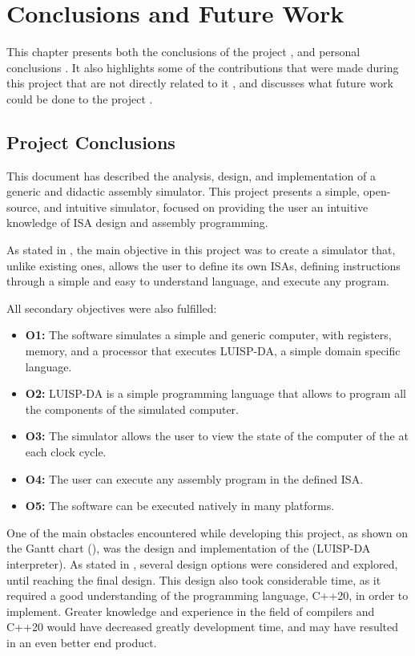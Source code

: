 \chapter{Conclusions and Future Work}\label{chap:conclusions}
This chapter presents both the conclusions of the project , and personal conclusions . It also highlights some of the contributions that were made during this project that are not directly related to it , and discusses what future work could be done to the project .


\section{Project Conclusions}\label{sec:project-conclusions}
This document has described the analysis, design, and implementation of a generic and didactic \gls{assembly} simulator. This project presents a simple, open-source, and intuitive simulator, focused on providing the user an intuitive knowledge of \gls{ISA} design and \gls{assembly} programming.

As stated in , the main objective in this project was to create a simulator that, unlike existing ones, allows the user to define its own \glspl{ISA}, defining instructions through a simple and easy to understand language, and execute any  program.

\noindent
All secondary objectives were also fulfilled:
\begin{itemize}
  \item \textbf{O1:} The software simulates a simple and generic computer, with \glspl{register}, \gls{memory}, and a processor that executes LUISP-DA, a simple domain specific language.
  \item \textbf{O2:} LUISP-DA is a simple \gls{programming language} that allows to program all the components of the simulated computer.
  \item \textbf{O3:} The simulator allows the user to view the state of the computer of the at each \gls{clock cycle}.
  \item \textbf{O4:} The user can execute any \gls{assembly} program in the defined \gls{ISA}.
  \item \textbf{O5:} The software can be executed natively in many platforms.
\end{itemize}

One of the main obstacles encountered while developing this project, as shown on the Gantt chart (), was the design and implementation of the  (LUISP-DA interpreter). As stated in , several design options were considered and explored, until reaching the final design. This design also took considerable time, as it required a good understanding of the programming language, C++20, in order to implement. Greater knowledge and experience in the field of compilers and C++20 would have decreased greatly development time, and may have resulted in an even better end product.



